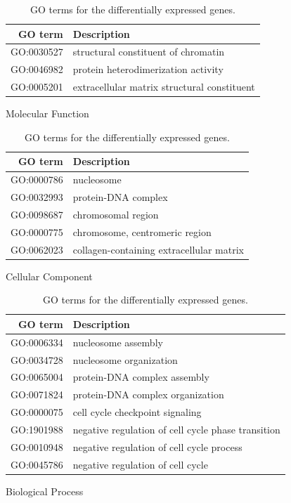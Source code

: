 \begin{table}[hbt]
	\centering
	\begin{subtable}[h]{0.49\textwidth}
		\centering
  		\begin{tabular}{r|p{4cm}}
    		\textbf{GO term} & \textbf{Description}\\
    		\hline
    		GO:0030527 & structural constituent of chromatin\\
    		GO:0046982 & protein heterodimerization activity\\
    		GO:0005201 & extracellular matrix structural constituent\\
  		\end{tabular}
  		\caption{Molecular Function}
  	\end{subtable}
  	\hfill
  	\begin{subtable}[h]{0.49\textwidth}
  		\centering
  		\begin{tabular}{r|p{4cm}}
  		 \textbf{GO term} & \textbf{Description}\\
  		 \hline
  		 GO:0000786 & nucleosome \\
  		 GO:0032993 & protein-DNA complex \\
  		 GO:0098687& chromosomal region\\
  		 GO:0000775 & chromosome, centromeric region\\
  		 GO:0062023 & collagen-containing extracellular matrix\\
  		\end{tabular}	
  		\caption{Cellular Component}
  	\end{subtable}
  	\hfill
  	\vspace{0.5cm}
  	\begin{subtable}[t]{\textwidth}
  		\centering
  		\begin{tabular}{r|p{8cm}}
  		 \textbf{GO term} & \textbf{Description}\\
  		 \hline
  		 GO:0006334 & nucleosome assembly \\
  		 GO:0034728 & nucleosome organization \\
  		 GO:0065004 & protein-DNA complex assembly\\
  		 GO:0071824 & protein-DNA complex organization \\
  		 GO:0000075 & cell cycle checkpoint signaling\\
  		 GO:1901988 & negative regulation of cell cycle phase transition\\
  		 GO:0010948 & negative regulation of cell cycle process\\
  		 GO:0045786 & negative regulation of cell cycle\\
  		\end{tabular}	
  		\caption{Biological Process}
  	\end{subtable}
  	\hfill
  	\vfill
  \caption{GO terms for the differentially expressed genes.}
  \label{table:go-all-DEG}
\end{table}

